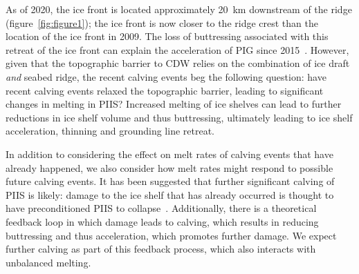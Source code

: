 \documentclass[draft]{agujournal2019}
\begin{document}
As of 2020, the ice front is located approximately 20~km downstream of the ridge (figure~\ref{fig:figure1}); the ice front is now closer to the ridge crest than the location of the ice front in 2009. The loss of buttressing associated with this retreat of the ice front can explain the acceleration of PIG since 2015~\cite{Joughin2021ScienceAdv}. However, given that the topographic barrier to CDW relies on the combination of ice draft \textit{and} seabed ridge, the recent calving events beg the following question: have recent calving events relaxed the topographic barrier, leading to significant changes in melting in PIIS? Increased melting of ice shelves can lead to further reductions in ice shelf volume and thus buttressing, ultimately leading to ice shelf acceleration, thinning and grounding line retreat.

In addition to considering the effect on melt rates of calving events that have already happened, we also consider how melt rates might respond to possible future calving events. It has been suggested that further significant calving of PIIS is likely: damage to the ice shelf that has already occurred is thought to have preconditioned PIIS to collapse~\cite{Lhermitte2020PNAS}. Additionally, there is a theoretical feedback loop in which damage leads to calving, which results in reducing buttressing and thus acceleration, which promotes further damage. We expect further calving as part of this feedback process, which also interacts with unbalanced melting. 
\end{document}
